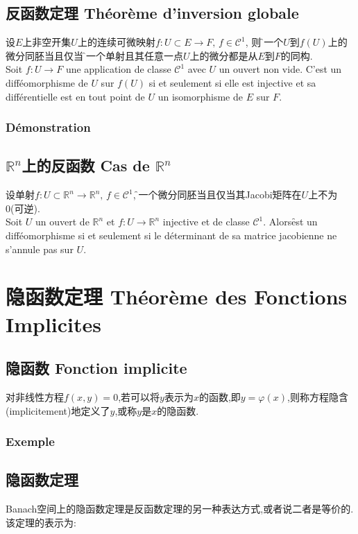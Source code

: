 \documentclass[12pt, a4paper, oneside]{ctexbook}
\newcommand{\R }{\mathbb{R}}%
\newcommand{\fai }{\varphi}%
\newcommand{\C }{\mathcal{C}}%
\begin{document}
  \subsection{反函数定理 Théorème d'inversion globale}
  设$E$上非空开集$U$上的连续可微映射$f:U\subset E\rightarrow F,\,f\in \C^1$,
  则\f 是一个$U$到$f(U)$上的微分同胚当且仅当\f 是一个单射且其任意一点$U$上的微分都是从$E$到$F$的同构.\\
  \indent
  Soit $f : U \rightarrow F$ une application de classe $\C^1 $ avec $U$ un ouvert non vide. 
  C'est un difféomorphisme de $U$ sur $f (U)$ si et seulement si elle est injective et sa différentielle est en tout point de $U$ un isomorphisme de $E$ sur $F$.
  \subsubsection{Démonstration}

  \subsection{$\R^n$上的反函数 Cas de $\R^n$}
  设单射$f:U\subset \R^n\rightarrow \R^n,\,f\in\C^1$,\f 是一个微分同胚当且仅当其Jacobi矩阵在$U$上不为0(可逆).\\
  \indent
  Soit $U$ un ouvert de $\R^n$ et $f : U \rightarrow \R^n$ injective et de classe $\C^1 $.
  Alors\f est un difféomorphisme si et seulement si le déterminant de sa matrice jacobienne ne s'annule pas sur $U$.

\section{隐函数定理 Théorème des Fonctions Implicites}
\subsection{隐函数 Fonction implicite}
    对非线性方程$f(x,y)=0$,若可以将$y$表示为$x$的函数,即$y=\fai(x)$,则称方程隐含(implicitement)地定义了$y$,或称$y$是$x$的隐函数.
    \subsubsection{Exemple}
\subsection{隐函数定理}
  Banach空间上的隐函数定理是反函数定理的另一种表达方式,或者说二者是等价的.
  该定理的表示为:\\
\end{document}

